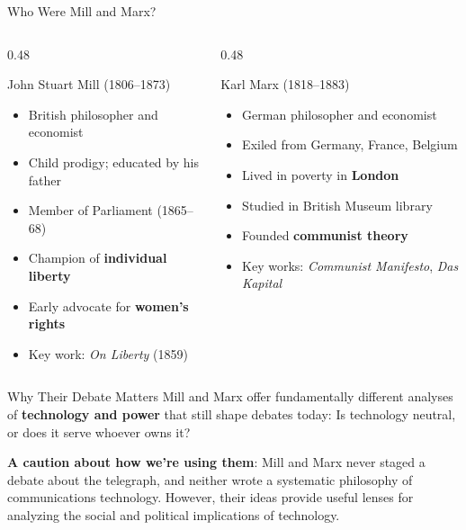 \documentclass[aspectratio=169,11pt]{beamer}
\begin{document}
\begin{frame}[shrink=8]{Who Were Mill and Marx?}
\begin{columns}
\begin{column}{0.48\textwidth}
\begin{block}{John Stuart Mill (1806--1873)}
\begin{itemize}
  \item British philosopher and economist
  \item Child prodigy; educated by his father
  \item Member of Parliament (1865--68)
  \item Champion of \textbf{individual liberty}
  \item Early advocate for \textbf{women's rights}
  \item Key work: \textit{On Liberty} (1859)
\end{itemize}
\end{block}
\end{column}

\begin{column}{0.48\textwidth}
\begin{alertblock}{Karl Marx (1818--1883)}
\begin{itemize}
  \item German philosopher and economist
  \item Exiled from Germany, France, Belgium
  \item Lived in poverty in \textbf{London}
  \item Studied in British Museum library
  \item Founded \textbf{communist theory}
  \item Key works: \textit{Communist Manifesto}, \textit{Das Kapital}
\end{itemize}
\end{alertblock}
\end{column}
\end{columns}

\vspace{0.3em}
\begin{exampleblock}{Why Their Debate Matters}
Mill and Marx offer fundamentally different analyses of \textbf{technology and power} that still shape debates today: Is technology neutral, or does it serve whoever owns it?
\end{exampleblock}

\vspace{0.2em}
{\scriptsize \textbf{A caution about how we're using them}: Mill and Marx never staged a debate about the telegraph, and neither wrote a systematic philosophy of communications technology. However, their ideas provide useful lenses for analyzing the social and political implications of technology.}
\end{frame}
\end{document}
